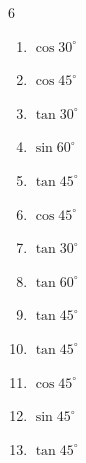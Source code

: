 \begin{multicols}{6}
\begin{enumerate}
  \item $\displaystyle \cos{30^\circ}$


  \item $\displaystyle \cos{45^\circ}$


  \item $\displaystyle \tan{30^\circ}$


  \item $\displaystyle \sin{60^\circ}$


  \item $\displaystyle \tan{45^\circ}$

        \phantom{$\displaystyle =1$}

  \item $\displaystyle \cos{45^\circ}$


  \item $\displaystyle \tan{30^\circ}$


  \item $\displaystyle \tan{60^\circ}$


\columnbreak %

  \item $\displaystyle \tan{45^\circ}$

        \phantom{$\displaystyle =1$}

  \item $\displaystyle \tan{45^\circ}$

        \phantom{$\displaystyle =1$}

  \item $\displaystyle \cos{45^\circ}$


  \item $\displaystyle \sin{45^\circ}$


  \item $\displaystyle \tan{45^\circ}$


\end{enumerate}
\end{multicols}
